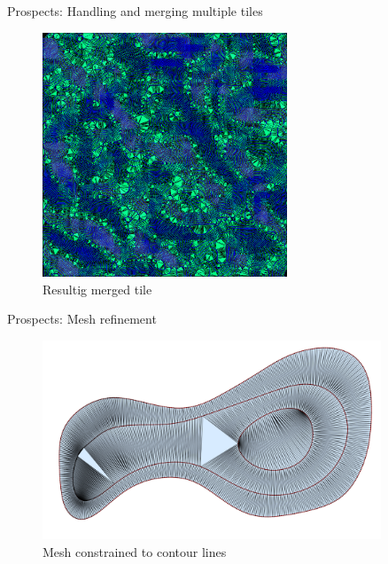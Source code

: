 \documentclass[10pt]{beamer}
\begin{document}
\begin{frame}{Prospects: Handling and merging multiple tiles}
  \begin{figure}[H]
    \centering
    \includegraphics[width=0.65\textwidth]{images/5.png}
    \caption{Resultig merged tile}
  \end{figure}
\end{frame}

\begin{frame}{Prospects: Mesh refinement}
  \begin{figure}[H]
    \centering
    \includegraphics[width=0.9\textwidth]{images/mesh.png}
    \caption{Mesh constrained to contour lines}
\end{figure}
\end{frame}
\end{document}
